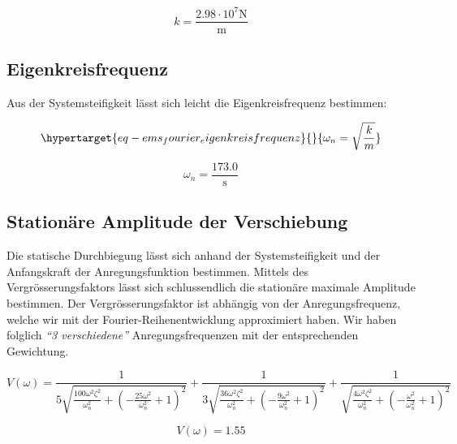 \documentclass[
  letterpaper,
  DIV=11]{scrreprt}
\begin{document}
\begin{equation}k = \frac{2.98 \cdot 10^{7} \text{N}}{\text{m}}\end{equation}

\hypertarget{eigenkreisfrequenz-6}{%
\subsection{Eigenkreisfrequenz}\label{eigenkreisfrequenz-6}}

Aus der Systemsteifigkeit lässt sich leicht die Eigenkreisfrequenz
bestimmen:

\begin{equation}\protect\hypertarget{eq-ems_fourier_eigenkreisfrequenz}{}{
\omega_n =\sqrt{\frac{k}{m}}
}\label{eq-ems_fourier_eigenkreisfrequenz}\end{equation}

\begin{equation}\omega_{n} = \frac{173.0}{\text{s}}\end{equation}

\hypertarget{stationuxe4re-amplitude-der-verschiebung}{%
\subsection{Stationäre Amplitude der
Verschiebung}\label{stationuxe4re-amplitude-der-verschiebung}}

Die statische Durchbiegung lässt sich anhand der Systemsteifigkeit und
der Anfangskraft der Anregungsfunktion bestimmen. Mittels des
Vergrösserungsfaktors lässt sich schlussendlich die stationäre maximale
Amplitude bestimmen. Der Vergrösserungsfaktor ist abhängig von der
Anregungsfrequenz, welche wir mit der Fourier-Reihenentwicklung
approximiert haben. Wir haben folglich \emph{``3 verschiedene''}
Anregungsfrequenzen mit der entsprechenden Gewichtung.

\begin{equation}V{\left(\omega \right)} = \frac{1}{5 \sqrt{\frac{100 \omega^{2} \zeta_{}^{2}}{\omega_{n}^{2}} + \left(- \frac{25 \omega^{2}}{\omega_{n}^{2}} + 1\right)^{2}}} + \frac{1}{3 \sqrt{\frac{36 \omega^{2} \zeta_{}^{2}}{\omega_{n}^{2}} + \left(- \frac{9 \omega^{2}}{\omega_{n}^{2}} + 1\right)^{2}}} + \frac{1}{\sqrt{\frac{4 \omega^{2} \zeta_{}^{2}}{\omega_{n}^{2}} + \left(- \frac{\omega^{2}}{\omega_{n}^{2}} + 1\right)^{2}}}\end{equation}

\begin{equation}V{\left(\omega \right)} = 1.55\end{equation}
\end{document}

